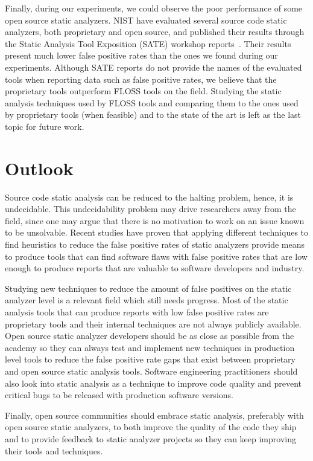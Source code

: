 Finally, during our experiments, we could observe the poor performance of some
open source static analyzers. NIST have evaluated several source code static
analyzers, both proprietary and open source, and published their results
through the Static Analysis Tool Exposition (SATE) workshop
reports~\citep{okun2013report}. Their results present much lower false positive
rates than the ones we found during our experiments. Although SATE reports do
not provide the names of the evaluated tools when reporting data such as false
positive rates, we believe that the proprietary tools outperform FLOSS tools on
the field. Studying the static analysis techniques used by FLOSS tools and
comparing them to the ones used by proprietary tools (when feasible) and to the
state of the art is left as the last topic for future work.

\section{Outlook}

Source code static analysis can be reduced to the halting problem, hence, it is
undecidable. This undecidability problem may drive researchers away from the
field, since one may argue that there is no motivation to work on an issue
known to be unsolvable. Recent studies have proven that applying different 
techniques to find heuristics to reduce the false positive rates of static
analyzers provide means to produce tools that can find software flaws with
false positive rates that are low enough to produce reports that are valuable
to software developers and industry.

Studying new techniques to reduce the amount of false positives on the static
analyzer level is a relevant field which still needs progress. Most of the
static analysis tools that can produce reports with low false positive
rates are proprietary tools and their internal techniques are not always
publicly available. Open source static analyzer developers should be as close
as possible from the academy so they can always test and implement new
techniques in production level tools to reduce the false positive rate gaps
that exist between proprietary and open source static analysis tools. Software
engineering practitioners should also look into static analysis as a technique
to improve code quality and prevent critical bugs to be released with
production software versions.

Finally, open source communities should embrace static analysis, preferably
with open source static analyzers, to both improve the quality of the code they
ship and to provide feedback to static analyzer projects so they can keep
improving their tools and techniques.
